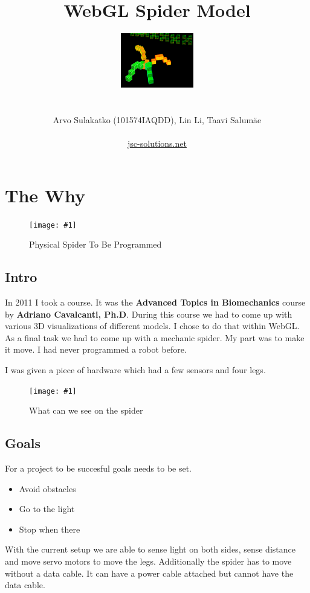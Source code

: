 \documentclass[12pt,leqno]{book}
\title{WebGL Spider Model}
\author{\includegraphics{../Design/Preview.png} \\ \\ \\ Arvo Sulakatko (101574IAQDD), Lin Li, Taavi Salumäe \\ \\ \href{http://www.jsc-solutions.net}{jsc-solutions.net} }
\newcommand{\png}[1]{\texttt{[image: \#1]}}
\newcommand{\figpng}[2]{\begin{figure}[htb]\centering\png{#1}\caption{#2}\end{figure}}
\begin{document}
\maketitle



\tableofcontents
\listoffigures


\chapter{The Why}

\figpng{Images/www.youtube.comvhKksAVmekAE_-_Google_Chrome-2012-03-14_16.27.22}
{Physical Spider To Be Programmed}




\section{Intro}

In 2011 I took a course. It was the \textbf{Advanced Topics in Biomechanics} course by \textbf{Adriano Cavalcanti, Ph.D}. During this course we had to come up with various 3D visualizations of different models. I chose to do that within WebGL. As a final task we had to come up with a mechanic spider. My part was to make it move. I had never programmed a robot before. 

I was given a piece of hardware which had a few sensors and four legs.

\figpng{Images/parts}
{What can we see on the spider}




\section{Goals}

For a project to be succesful goals needs to be set.

\begin{itemize}
\item Avoid obstacles
\item Go to the light
\item Stop when there
\end{itemize}

With the current setup we are able to sense light on both sides, sense distance and move servo motors to move the legs. Additionally the spider has to move without a data cable. It can have a power cable attached but cannot have the data cable.
\end{document}
